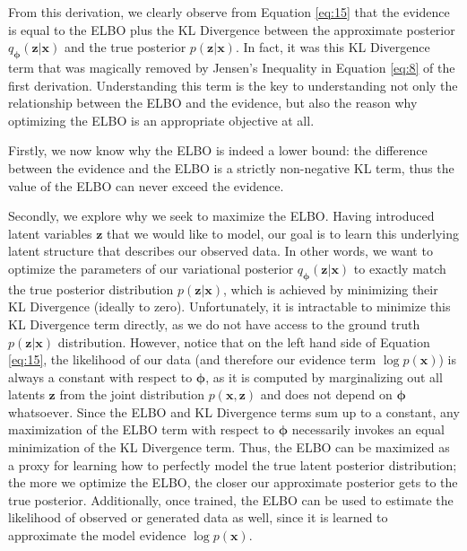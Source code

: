 From this derivation, we clearly observe from Equation \ref{eq:15} that the evidence is equal to the ELBO plus the KL Divergence between the approximate posterior $q_{\bm{\phi}}(\bm{z}|\bm{x})$ and the true posterior $p(\bm{z}|\bm{x})$.  In fact, it was this KL Divergence term that was magically removed by Jensen's Inequality in Equation \ref{eq:8} of the first derivation.  Understanding this term is the key to understanding not only the relationship between the ELBO and the evidence, but also the reason why optimizing the ELBO is an appropriate objective at all.

Firstly, we now know why the ELBO is indeed a lower bound: the difference between the evidence and the ELBO is a strictly non-negative KL term, thus the value of the ELBO can never exceed the evidence.

Secondly, we explore why we seek to maximize the ELBO.  Having introduced latent variables $\bm{z}$ that we would like to model, our goal is to learn this underlying latent structure that describes our observed data.  In other words, we want to optimize the parameters of our variational posterior $q_{\bm{\phi}}(\bm{z}|\bm{x})$ to exactly match the true posterior distribution $p(\bm{z}|\bm{x})$, which is achieved by minimizing their KL Divergence (ideally to zero).  Unfortunately, it is intractable to minimize this KL Divergence term directly, as we do not have access to the ground truth $p(\bm{z}|\bm{x})$ distribution.  However, notice that on the left hand side of Equation \ref{eq:15}, the likelihood of our data (and therefore our evidence term $\log p(\bm{x})$) is always a constant with respect to $\bm{\phi}$, as it is computed by marginalizing out all latents $\bm{z}$ from the joint distribution $p(\bm{x}, \bm{z})$ and does not depend on $\bm{\phi}$ whatsoever.  Since the ELBO and KL Divergence terms sum up to a constant, any maximization of the ELBO term with respect to $\bm{\phi}$ necessarily invokes an equal minimization of the KL Divergence term.  Thus, the ELBO can be maximized as a proxy for learning how to perfectly model the true latent posterior distribution; the more we optimize the ELBO, the closer our approximate posterior gets to the true posterior.  Additionally, once trained, the ELBO can be used to estimate the likelihood of observed or generated data as well, since it is learned to approximate the model evidence $\log p(\bm{x})$.

